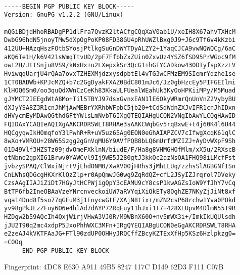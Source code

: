 \begin{minipage}{.5\linewidth}
\begin{small}
\begin{verbatim}

-----BEGIN PGP PUBLIC KEY BLOCK-----
Version: GnuPG v1.2.2 (GNU/Linux)

mQGiBDjdHhoRBADgPP1dlFra7QvzK2ltACfgCQqXaV0ab1U/xeIH8X67ahvTXHcM
DwbG96hdN5jnoyTMw5dXpOgPoKP08FD38GU4pRhUWZlBxg0J9+J6c9Tf6v4kKzbi
412UU+HAzqHszFOtbSYosjPtlkgSuGnDWYTDyALZY2+1YaqCJCA9vwNQWQCg/6aC
aKQ6Te1H/k6V421sWmqTtvUD/2pF7FfbbZxZUin0ZxvUz4YSZ6fSD95PrWGoc9fM
owt2H/JttSnju8VS9/kNxHx+u2LXepxkSr3QcG1+hGIYCADkow43ODTyfspXzzLV
HviwqqUarjU4rQAa7ovxTZHEXMjdzxysdpbtEl4vTG3wCFMzEM9SIemrYdzhe1se
1CT0BADWb+KPJcMZQ+b7c2GgDyakFXAZ0BdC801mJc6/Jz0gbHzcEy5PIFGEIlmi
KlHOQ6Sm0/oo3quQdXWnCzCeKh83KkaULFUealWEahUk3KyOoHPKiiMPy/M5Muad
gJYMCT2IEEgdWtA8Mo+Til5TBYJ97dsxGvnxEAN1lE6OkyWRmrQnUnVnZ2VybyBU
dXJyYSA8Z3R1cnJhMjAwMEBrYXRhbWFpbC5jb20+tCdSdWdnZXJvIFR1cnJhIDxn
dHVycmEyMDAwQGthdGFtYWlsLmNvbT6IXgQTEQIAHgUCQN2VNgIbAwYLCQgHAwID
FQIDAxYCAQIeAQIXgAAKCRDRSWLT8RHAe3sAAKCWqbGv5rqBxwE+t4j60K4l6U44
HQCgyqwIkHOmqfoY3lPwhR+R+uV5uz65Ag0EON0eGhAIAPZCV7cIfwgXcqK61qlC
8wXo+VMROU+28W65Szgg2gGnVqMU6Y9AVfPQB8bLQ6mUrfdMZIZJ+AyDvWXpF9Sh
01D49Vlf3HZSTz09jdvOmeFXklnN/biudE/F/Ha8g8VHMGHOfMlm/xX5u/2RXscB
qtNbno2gpXI61Brwv0YAWCvl9Ij9WE5J280gtJ3kkQc2azNsOA1FHQ98iLMcfFst
jvbzySPAQ/ClWxiNjrtVjLhdONM0/XwXV0OjHRhs3jMhLLUq/zzhsSlAGBGNfISn
CnLWhsQDGcgHKXrKlQzZlp+r0ApQmwJG0wg9ZqRdQZ+cfL2JSyIZJrqrol7DVeky
CzsAAgIIAJiZiDt7HGyJtHCPWjigQpY3cEAMU9cY8csP1kwAGZsIoW9YfJhY7vCq
BtTP6fb2IneOBAaVzeYNrcnveckoiUW7aRVYqiXiQkETy8OghZE7NKyZjJiNt8xf
vqa14Dnd8f5so77qGFuM3j1FnycwGtF/XAjN8tix+/mZN2csP68rchw1Yva0POkd
yv98gPkJLzZFuy6O6e4hlAd7dAYP72RqEuy11hJxi1t7+428XLUpvM4DlmN55I9R
HZDgw2b59AQcIh4QxjWirjVHwA3VJ0R/M9WBnX60O+nv5mWX3i+/ImkIkUQUlsdh
jJU2T90q2mc4xdpP5JxoPhhWXC3MFn+IRgQYEQIABgUCON0eGgAKCRDRSWLT8RHA
e2zeAJ4kVKTFAaJG+FTl90zdUP0OHHyJRQCffZBcyKZTExXfHp5KSz6Hzlpkzg0=
=COOq
-----END PGP PUBLIC KEY BLOCK-----
\end{verbatim}
\end{small}
\end{minipage}
\newline\newline
\noindent
Fingerprint: \textup{\textsf{4DC8 E630 A911 49B5 8247 117C D149 62D3 F111 C07B}}
\rmfamily\upshape


